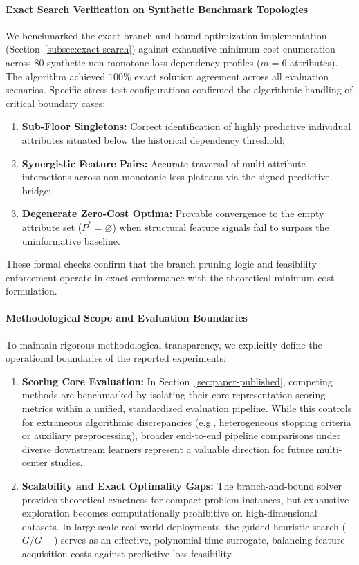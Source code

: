 \paragraph{Exact Search Verification on Synthetic Benchmark Topologies}
We benchmarked the exact branch-and-bound optimization implementation (Section~\ref{subsec:exact-search}) against exhaustive minimum-cost enumeration across $80$ synthetic non-monotone loss-dependency profiles ($m=6$ attributes). The algorithm achieved $100\%$ exact solution agreement across all evaluation scenarios. Specific stress-test configurations confirmed the algorithmic handling of critical boundary cases:
\begin{enumerate}[label=(\arabic*), leftmargin=*]
	\item \textbf{Sub-Floor Singletons:} Correct identification of highly predictive individual attributes situated below the historical dependency threshold;
	\item \textbf{Synergistic Feature Pairs:} Accurate traversal of multi-attribute interactions across non-monotonic loss plateaus via the signed predictive bridge;
	\item \textbf{Degenerate Zero-Cost Optima:} Provable convergence to the empty attribute set ($P^* = \varnothing$) when structural feature signals fail to surpass the uninformative baseline.
\end{enumerate}
These formal checks confirm that the branch pruning logic and feasibility enforcement operate in exact conformance with the theoretical minimum-cost formulation.

\paragraph{Methodological Scope and Evaluation Boundaries}
To maintain rigorous methodological transparency, we explicitly define the operational boundaries of the reported experiments:
\begin{enumerate}[label=(\arabic*), leftmargin=*]
	\item \textbf{Scoring Core Evaluation:} In Section~\ref{sec:paper-published}, competing methods are benchmarked by isolating their core representation scoring metrics within a unified, standardized evaluation pipeline. While this controls for extraneous algorithmic discrepancies (e.g., heterogeneous stopping criteria or auxiliary preprocessing), broader end-to-end pipeline comparisons under diverse downstream learners represent a valuable direction for future multi-center studies.
	\item \textbf{Scalability and Exact Optimality Gaps:} The branch-and-bound solver provides theoretical exactness for compact problem instances, but exhaustive exploration becomes computationally prohibitive on high-dimensional datasets. In large-scale real-world deployments, the guided heuristic search ($G/G+$) serves as an effective, polynomial-time surrogate, balancing feature acquisition costs against predictive loss feasibility.
\end{enumerate}